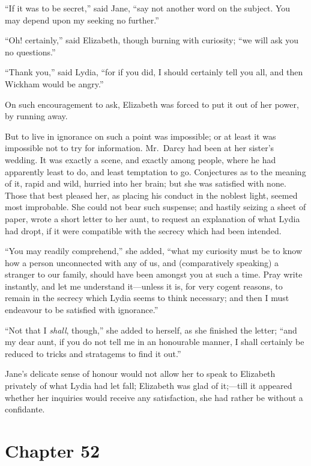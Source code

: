 ``If it was to be secret,'' said Jane, ``say not another word on
the subject.  You may depend upon my seeking no further.''

``Oh! certainly,'' said Elizabeth, though burning with curiosity;
``we will ask you no questions.''

``Thank you,'' said Lydia, ``for if you did, I should certainly
tell you all, and then Wickham would be angry.''

On such encouragement to ask, Elizabeth was forced to put it
out of her power, by running away.

But to live in ignorance on such a point was impossible; or at
least it was impossible not to try for information.  Mr.\ Darcy
had been at her sister's wedding.  It was exactly a scene, and
exactly among people, where he had apparently least to do, and
least temptation to go.  Conjectures as to the meaning of it,
rapid and wild, hurried into her brain; but she was satisfied
with none.  Those that best pleased her, as placing his conduct
in the noblest light, seemed most improbable.  She could not
bear such suspense; and hastily seizing a sheet of paper, wrote
a short letter to her aunt, to request an explanation of what
Lydia had dropt, if it were compatible with the secrecy which
had been intended.

``You may readily comprehend,'' she added, ``what my curiosity
must be to know how a person unconnected with any of us, and
(comparatively speaking) a stranger to our family, should have
been amongst you at such a time.  Pray write instantly, and
let me understand it---unless it is, for very cogent reasons,
to remain in the secrecy which Lydia seems to think necessary;
and then I must endeavour to be satisfied with ignorance.''

``Not that I \emph{shall}, though,'' she added to herself, as she
finished the letter; ``and my dear aunt, if you do not tell me
in an honourable manner, I shall certainly be reduced to tricks
and stratagems to find it out.''

Jane's delicate sense of honour would not allow her to speak to
Elizabeth privately of what Lydia had let fall; Elizabeth was
glad of it;---till it appeared whether her inquiries would
receive any satisfaction, she had rather be without a confidante.



\chapter{Chapter 52}



